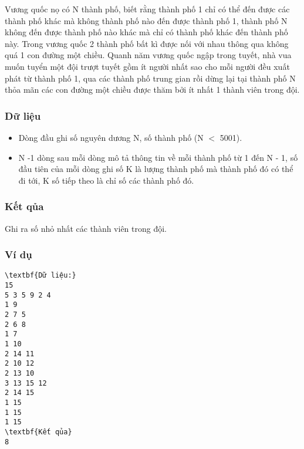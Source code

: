 







   Vương quốc nọ có N thành phố, biết rằng thành phố 1 chỉ có thể đến được các thành phố khác mà không thành phố nào đến được thành phố 1, thành phố N không đến được thành phố nào khác mà chỉ có thành phố khác đến thành phố này. Trong vương quốc 2 thành phố bất kì được nối với nhau thông qua không quá 1 con đường một chiều. Quanh năm vương quốc ngập trong tuyết, nhà vua muốn tuyển một đội trượt tuyết gồm ít người nhất sao cho mỗi người đều xuất phát từ thành phố 1, qua các thành phố trung gian rồi dừng lại tại thành phố N thỏa mãn các con đường một chiều được thăm bởi ít nhất 1 thành viên trong đội.  

\subsubsection{   Dữ liệu  }
\begin{itemize}
	\item     Dòng đầu ghi số nguyên dương N, số thành phố (N $<$ 5001).   
	\item     N -1 dòng sau mỗi dòng mô tả thông tin về mỗi thành phố từ 1 đến N - 1, số đầu tiên của mỗi dòng ghi số K là lượng thành phố mà thành phố đó có thể đi tới, K số tiếp theo là chỉ số các thành phố đó.   
\end{itemize}

\subsubsection{   Kết qủa  }

   Ghi ra số nhỏ nhất các thành viên trong đội.  

\subsubsection{   Ví dụ  }
\begin{verbatim}
\textbf{Dữ liệu:} 
15
5 3 5 9 2 4
1 9
2 7 5
2 6 8
1 7
1 10
2 14 11
2 10 12
2 13 10
3 13 15 12
2 14 15
1 15
1 15
1 15
\textbf{Kết qủa} 
8 
\end{verbatim}

